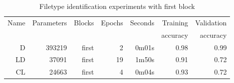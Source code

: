 \begin{table}[!ht]
    \centering
    \caption{Filetype identification experiments with first block}
    \label{tab:carving7-11}
\begin{tabular}{r|r|r|r|r|r|r}
\hline
Name & Parameters & Blocks & Epochs & Seconds & Training          & Validation          \\       
     &            &        &        &         &          accuracy &            accuracy \\ \hline\hline

D    & 393219     & first  & 2      & 0m01s   & 0.98              & 0.99                \\ \hline
LD   & 37091      & first  & 19     & 1m50s   & 0.91              & 0.72                \\ \hline
CL   & 24663      & first  & 4      & 0m04s   & 0.93              & 0.72                \\ \hline
\end{tabular}
\end{table}